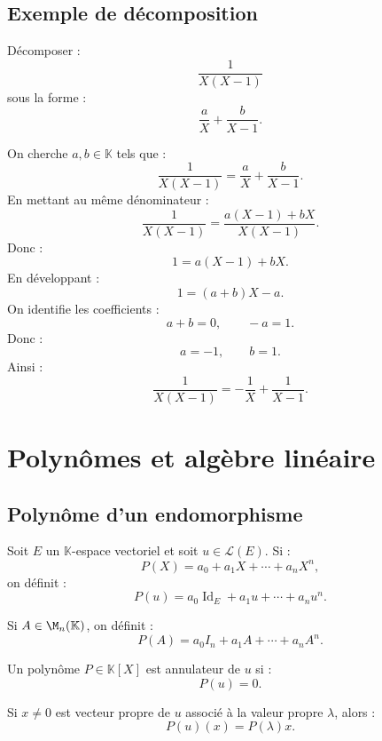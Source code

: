 \documentclass[11pt,a4paper]{article}
\newcommand{\K}{\mathbb K}
\newcommand{\Id}{\operatorname{Id}}
\begin{document}
\subsection{Exemple de décomposition}

\begin{exercicebox}
Décomposer :
\[
\frac{1}{X(X-1)}
\]
sous la forme :
\[
\frac{a}{X}+\frac{b}{X-1}.
\]
\end{exercicebox}

\begin{correctionbox}
On cherche \(a,b\in\K\) tels que :
\[
\frac{1}{X(X-1)}
=
\frac{a}{X}+\frac{b}{X-1}.
\]
En mettant au même dénominateur :
\[
\frac{1}{X(X-1)}
=
\frac{a(X-1)+bX}{X(X-1)}.
\]
Donc :
\[
1=a(X-1)+bX.
\]
En développant :
\[
1=(a+b)X-a.
\]
On identifie les coefficients :
\[
a+b=0,
\qquad
-a=1.
\]
Donc :
\[
a=-1,
\qquad
b=1.
\]
Ainsi :
\[
\frac{1}{X(X-1)}
=
-\frac1X+\frac1{X-1}.
\]
\end{correctionbox}

\section{Polynômes et algèbre linéaire}

\subsection{Polynôme d'un endomorphisme}

\begin{definitionbox}
Soit \(E\) un \(\K\)-espace vectoriel et soit \(u\in\mathcal L(E)\).  
Si :
\[
P(X)=a_0+a_1X+\cdots+a_nX^n,
\]
on définit :
\[
P(u)=a_0\Id_E+a_1u+\cdots+a_nu^n.
\]
\end{definitionbox}

\begin{definitionbox}
Si \(A\in\M_n(\K)\), on définit :
\[
P(A)=a_0I_n+a_1A+\cdots+a_nA^n.
\]
\end{definitionbox}

\begin{definitionbox}
Un polynôme \(P\in\K[X]\) est annulateur de \(u\) si :
\[
P(u)=0.
\]
\end{definitionbox}

\begin{theorembox}
Si \(x\neq0\) est vecteur propre de \(u\) associé à la valeur propre \(\lambda\), alors :
\[
P(u)(x)=P(\lambda)x.
\]
\end{theorembox}
\end{document}
